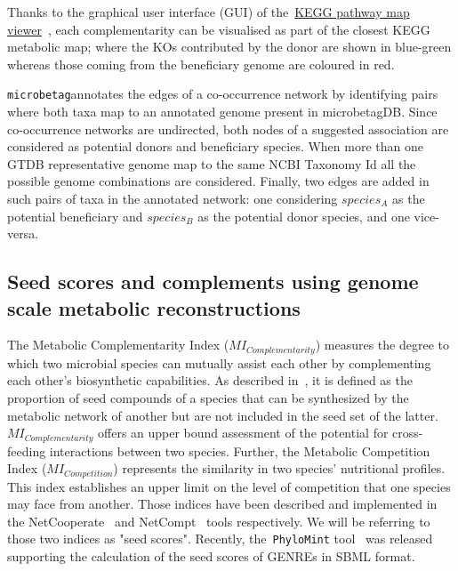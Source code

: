 \documentclass[sn-mathphys,Numbered]{sn-jnl}  %
\theoremstyle{thmstyleone}%
\theoremstyle{thmstyletwo}%
\theoremstyle{thmstylethree}%
\newcommand{\microbetag}{\texttt{microbetag}}
\begin{document}
        Thanks to the graphical user interface (GUI) of the~\href{https://www.kegg.jp/kegg/docs/color_gui.html}{KEGG pathway map viewer}~\cite{kanehisa2020kegg,kanehisa2022kegg}, 
        each complementarity can be visualised as part of the closest KEGG metabolic map; 
        where the KOs contributed by the donor are shown in blue-green whereas those coming from the beneficiary genome are coloured in red.

        \microbetag annotates the edges of a co-occurrence network by identifying pairs where both taxa map to an annotated genome present in microbetagDB.
        Since co-occurrence networks are undirected, both nodes of a suggested association are considered as potential donors and beneficiary species. 
        When more than one GTDB representative genome map to the same NCBI Taxonomy Id all the possible genome combinations are considered.
        Finally, two edges are added in such pairs of taxa in the annotated network: 
        one considering $species_A$ as the potential beneficiary and $species_B$ as the potential donor species, and one vice-versa. 


    \subsection*{Seed scores and complements using genome scale metabolic reconstructions }
    \label{subsec:seeds}

        The Metabolic Complementarity Index ($MI_{Complementarity}$) measures the degree to which two microbial species can mutually assist each other by complementing each other's biosynthetic capabilities.
        As described in~\cite{phylomint_ms}, it is defined as the proportion of seed compounds of a species that can be synthesized by the metabolic network of another but are not included in the seed set of the latter. 
        $MI_{Complementarity}$ offers an upper bound assessment of the potential for cross-feeding interactions between two species.
        Further, the Metabolic Competition Index ($MI_{Competition}$) represents the similarity in two species' nutritional profiles. 
        This index establishes an upper limit on the level of competition that one species may face from another.
        Those indices have been described and implemented in the NetCooperate~\cite{levy2015netcooperate} and NetCompt~\cite{kreimer2012netcmpt} tools respectively.
        We will be referring to those two indices as "seed scores".
        Recently, the~\texttt{PhyloMint} tool~\cite{phylomint_ms} was released supporting the calculation of the seed scores of GENREs in SBML format.
\end{document}
